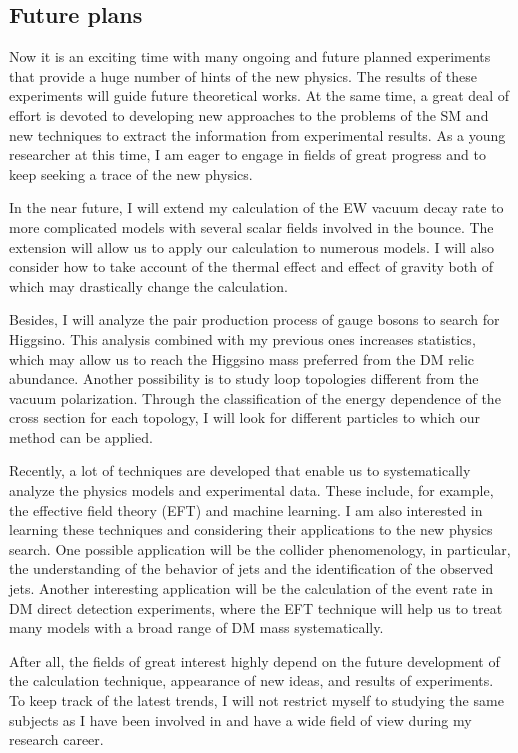 \documentclass[12pt,notitlepage]{article}
\begin{document}
\vspace*{-2mm}
\subsection*{Future plans}

Now it is an exciting time with many ongoing and future planned experiments that provide a huge number of hints of the new physics.
The results of these experiments will guide future theoretical works.
At the same time, a great deal of effort is devoted to developing new approaches to the problems of the SM and new techniques to extract the information from experimental results.
As a young researcher at this time, I am eager to engage in fields of great progress and to keep seeking a trace of the new physics.

In the near future, I will extend my calculation of the EW vacuum decay rate to more complicated models with several scalar fields involved in the bounce.
The extension will allow us to apply our calculation to numerous models.
I will also consider how to take account of the thermal effect and effect of gravity both of which may drastically change the calculation.

Besides, I will analyze the pair production process of gauge bosons to search for Higgsino.
This analysis combined with my previous ones increases statistics, which may allow us to reach the Higgsino mass preferred from the DM relic abundance.
Another possibility is to study loop topologies different from the vacuum polarization.
Through the classification of the energy dependence of the cross section for each topology, I will look for different particles to which our method can be applied.

Recently, a lot of techniques are developed that enable us to systematically analyze the physics models and experimental data.
These include, for example, the effective field theory (EFT) and machine learning.
I am also interested in learning these techniques and considering their applications to the new physics search.
One possible application will be the collider phenomenology, in particular, the understanding of the behavior of jets and the identification of the observed jets.
Another interesting application will be the calculation of the event rate in DM direct detection experiments, where the EFT technique will help us to treat many models with a broad range of DM mass systematically.

After all, the fields of great interest highly depend on the future development of the calculation technique, appearance of new ideas, and results of experiments.
To keep track of the latest trends, I will not restrict myself to studying the same subjects as I have been involved in and have a wide field of view during my research career.
\end{document}
